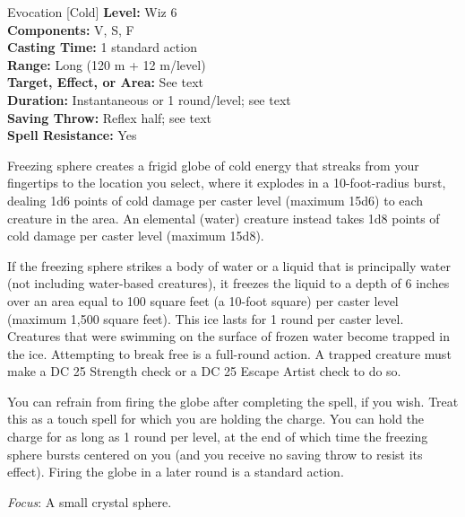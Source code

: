 {Evocation [Cold]}
{
	\textbf{Level:}
	Wiz 6\\
	\textbf{Components:}
	V, S, F\\
	\textbf{Casting Time:}
	1 standard action\\
	\textbf{Range:}
	Long (120 m + 12 m/level)\\
	\textbf{Target, Effect, or Area:}
	See text\\
	\textbf{Duration:}
	Instantaneous or 1 round/level; see text\\
	\textbf{Saving Throw:}
	Reflex half; see text\\
	\textbf{Spell Resistance:}
	Yes\\
}
{
	Freezing sphere creates a frigid globe of cold energy that streaks from your fingertips to the location you select, where it explodes in a 10-foot-radius burst, dealing 1d6 points of cold damage per caster level (maximum 15d6) to each creature in the area. An elemental (water) creature instead takes 1d8 points of cold damage per caster level (maximum 15d8).

	If the freezing sphere strikes a body of water or a liquid that is principally water (not including water-based creatures), it freezes the liquid to a depth of 6 inches over an area equal to 100 square feet (a 10-foot square) per caster level (maximum 1,500 square feet). This ice lasts for 1 round per caster level. Creatures that were swimming on the surface of frozen water become trapped in the ice. Attempting to break free is a full-round action. A trapped creature must make a DC 25 Strength check or a DC 25 Escape Artist check to do so.

	You can refrain from firing the globe after completing the spell, if you wish. Treat this as a touch spell for which you are holding the charge. You can hold the charge for as long as 1 round per level, at the end of which time the freezing sphere bursts centered on you (and you receive no saving throw to resist its effect). Firing the globe in a later round is a standard action.

	\textit{Focus}:
	A small crystal sphere.

}
